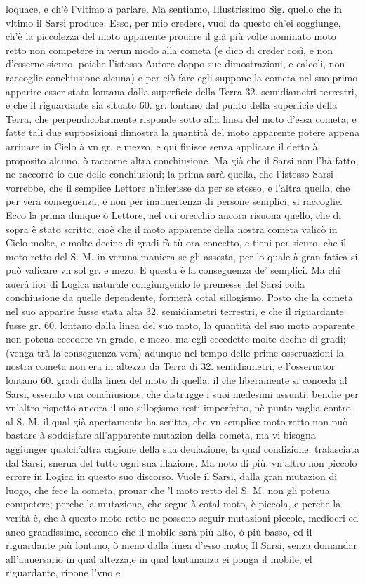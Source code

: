 \documentclass[11pt,twoside,openany]{book}
\begin{document}
loquace, e ch'è l'vltimo a parlare. Ma sentiamo, Illustrissimo Sig. quello che in vltimo il Sarsi produce. Esso, per mio credere, vuol da questo ch'ei soggiunge, ch'è la piccolezza del moto apparente prouare il già più volte nominato moto retto non competere in verun modo alla cometa (e dico di creder così, e non d'esserne sicuro, poiche l'istesso Autore doppo sue dimostrazioni, e calcoli, non raccoglie conchiusione alcuna) e per ciò fare egli suppone la cometa nel suo primo apparire esser stata lontana dalla superficie della Terra 32. semidiametri terrestri, e che il riguardante sia situato 60. gr. lontano dal punto della superficie della Terra, che perpendicolarmente risponde sotto alla linea del moto d'essa cometa; e fatte tali due supposizioni dimostra la quantità del moto apparente potere appena arriuare in Cielo à vn gr. e mezzo, e quì finisce senza applicare il detto à proposito alcuno, ò raccorne altra conchiusione. Ma già che il Sarsi non l'hà fatto, ne raccorrò io due delle conchiusioni; la prima sarà quella, che l'istesso Sarsi vorrebbe, che il semplice Lettore n'inferisse da per se stesso, e l'altra quella, che per vera conseguenza, e non per inauuertenza di persone semplici, si raccoglie. Ecco la prima dunque ò Lettore, nel cui orecchio ancora risuona quello, che di sopra è stato scritto, cioè che il moto apparente della nostra cometa valicò in Cielo molte, e molte decine di gradi fà tù ora concetto, e tieni per sicuro, che il moto retto del S. M. in veruna maniera se gli assesta, per lo quale à gran fatica si può valicare vn sol gr. e mezo. E questa è la conseguenza de' semplici. Ma chi auerà fior di Logica naturale congiungendo le premesse del Sarsi colla conchiusione da quelle dependente, formerà cotal sillogismo. Posto che la cometa nel suo apparire fusse stata alta 32. semidiametri terrestri, e che il riguardante fusse gr. 60. lontano dalla linea del suo moto, la quantità del suo moto apparente non poteua eccedere vn grado, e mezo, ma egli eccedette molte decine di gradi; (venga trà la conseguenza vera) adunque nel tempo delle prime osseruazioni la nostra cometa non era in altezza da Terra di 32. semidiametri, e l'osseruator lontano 60. gradi dalla linea del moto di quella: il che liberamente si conceda al Sarsi, essendo vna conchiusione, che distrugge i suoi medesimi assunti: benche per vn'altro rispetto ancora il suo sillogismo resti imperfetto, nè punto vaglia contro al S. M. il qual già apertamente ha scritto, che vn semplice moto retto non può bastare à soddisfare all'apparente mutazion della cometa, ma vi bisogna aggiunger qualch'altra cagione della sua deuiazione, la qual condizione, tralasciata dal Sarsi, snerua del tutto ogni sua illazione. Ma noto di più, vn'altro non piccolo errore in Logica in questo suo discorso. Vuole il Sarsi, dalla gran mutazion di luogo, che fece la cometa, prouar che 'l moto retto del S. M. non gli poteua competere; perche la mutazione, che segue à cotal moto, è piccola, e perche la verità è, che à questo moto retto ne possono seguir mutazioni piccole, mediocri ed anco grandissime, secondo che il mobile sarà più alto, ò più basso, ed il riguardante più lontano, ò meno dalla linea d'esso moto; Il Sarsi, senza domandar all'auuersario in qual altezza,e in qual lontananza ei ponga il mobile, el riguardante, ripone l'vno e 
\end{document}
